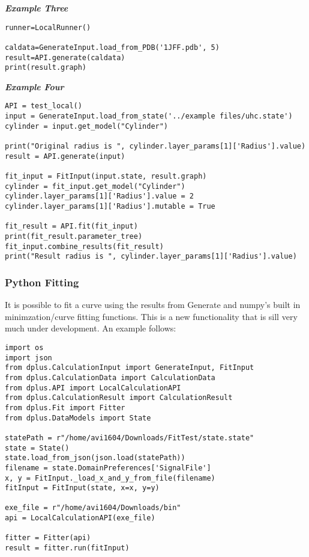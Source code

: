 \documentclass[../D+Manual.tex]{subfiles}
\begin{document}
\textbf{\emph{Example Three}}

\begin{lstlisting}[style=pythonstyle]
runner=LocalRunner()

caldata=GenerateInput.load_from_PDB('1JFF.pdb', 5)
result=API.generate(caldata)
print(result.graph)
\end{lstlisting}

\textbf{\emph{Example Four}}

\begin{lstlisting}[style=pythonstyle]
API = test_local()
input = GenerateInput.load_from_state('../example files/uhc.state')
cylinder = input.get_model("Cylinder")

print("Original radius is ", cylinder.layer_params[1]['Radius'].value)
result = API.generate(input)

fit_input = FitInput(input.state, result.graph)
cylinder = fit_input.get_model("Cylinder")
cylinder.layer_params[1]['Radius'].value = 2
cylinder.layer_params[1]['Radius'].mutable = True

fit_result = API.fit(fit_input)
print(fit_result.parameter_tree)
fit_input.combine_results(fit_result)
print("Result radius is ", cylinder.layer_params[1]['Radius'].value)
\end{lstlisting}

\subsubsection{Python Fitting}\label{python-fitting}

It is possible to fit a curve using the results from Generate and
numpy's built in minimzation/curve fitting functions. This is a new
functionality that is sill very much under development. An example
follows:

\begin{lstlisting}[style=pythonstyle]
import os
import json
from dplus.CalculationInput import GenerateInput, FitInput
from dplus.CalculationData import CalculationData
from dplus.API import LocalCalculationAPI
from dplus.CalculationResult import CalculationResult
from dplus.Fit import Fitter
from dplus.DataModels import State

statePath = r"/home/avi1604/Downloads/FitTest/state.state"
state = State()
state.load_from_json(json.load(statePath))
filename = state.DomainPreferences['SignalFile']
x, y = FitInput._load_x_and_y_from_file(filename)
fitInput = FitInput(state, x=x, y=y)

exe_file = r"/home/avi1604/Downloads/bin"
api = LocalCalculationAPI(exe_file)

fitter = Fitter(api)
result = fitter.run(fitInput)
\end{lstlisting}
\end{document}
